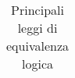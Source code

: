 \documentclass[a4paper,11pt]{report}
\begin{document}
\begin{table}[H]
\begin{tabular}{|l|l|}
            \end{tabular}
            \caption{Principali leggi di equivalenza logica}
        \end{table}

        
\end{document}
